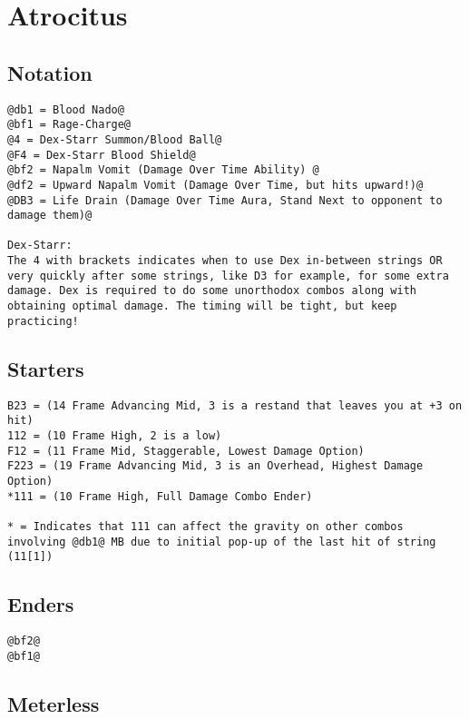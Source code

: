 \documentclass[main.tex]{subfiles}
\begin{document}
\chapter{Atrocitus}

\section{Notation}
\begin{lstlisting}[language=FG]
@db1 = Blood Nado@
@bf1 = Rage-Charge@
@4 = Dex-Starr Summon/Blood Ball@
@F4 = Dex-Starr Blood Shield@
@bf2 = Napalm Vomit (Damage Over Time Ability) @
@df2 = Upward Napalm Vomit (Damage Over Time, but hits upward!)@
@DB3 = Life Drain (Damage Over Time Aura, Stand Next to opponent to damage them)@

Dex-Starr:
The 4 with brackets indicates when to use Dex in-between strings OR very quickly after some strings, like D3 for example, for some extra damage. Dex is required to do some unorthodox combos along with obtaining optimal damage. The timing will be tight, but keep practicing!
\end{lstlisting}




\section{Starters}
\begin{lstlisting}[language=FG]
B23 = (14 Frame Advancing Mid, 3 is a restand that leaves you at +3 on hit)
112 = (10 Frame High, 2 is a low)
F12 = (11 Frame Mid, Staggerable, Lowest Damage Option)
F223 = (19 Frame Advancing Mid, 3 is an Overhead, Highest Damage Option)
*111 = (10 Frame High, Full Damage Combo Ender)

* = Indicates that 111 can affect the gravity on other combos involving @db1@ MB due to initial pop-up of the last hit of string (11[1])
\end{lstlisting}

\section{Enders}

\begin{lstlisting}[language=FG]
@bf2@
@bf1@
\end{lstlisting}

\section{Meterless}
\end{document}
